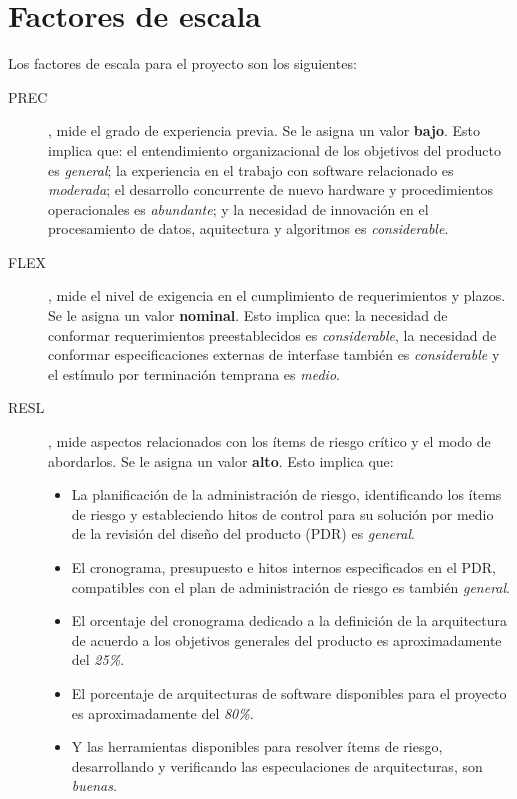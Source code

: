 \documentclass[11pt,a4paper,spanish,twoside]{book}
\begin{document}
\section{Factores de escala}
Los factores de escala para el proyecto son los siguientes:
\begin{description}
\item[PREC], mide el grado de experiencia previa. Se le asigna un valor
\textbf{bajo}. Esto implica que: el entendimiento organizacional de los objetivos del producto es \emph{general}; la experiencia en el trabajo con
software relacionado es \emph{moderada}; el desarrollo concurrente de nuevo
hardware y procedimientos operacionales es \emph{abundante}; y la necesidad
de innovación en el procesamiento de datos, aquitectura y algoritmos es
\emph{considerable}.

\item[FLEX], mide el nivel de exigencia en el cumplimiento de requerimientos
y plazos. Se le asigna un valor \textbf{nominal}. Esto implica que: la
necesidad de conformar requerimientos preestablecidos es \emph{considerable},
la necesidad de conformar especificaciones externas de interfase también es
\emph{considerable} y el estímulo por terminación temprana es \emph{medio}.

\item[RESL], mide aspectos relacionados con los ítems de riesgo crítico y el
modo de abordarlos. Se le asigna un valor \textbf{alto}. Esto implica que:
\begin{itemize}
\item La planificación de la administración de riesgo, identificando los
ítems de riesgo y estableciendo hitos de control para su solución por medio
de la revisión del diseño del producto (PDR) es \emph{general}.
\item El cronograma, presupuesto e hitos internos especificados en el PDR,
compatibles con el plan de administración de riesgo es también \emph{general}.
\item El orcentaje del cronograma dedicado a la definición de la arquitectura
de acuerdo a los objetivos generales del producto es aproximadamente del
\emph{25\%}.
\item El porcentaje de arquitecturas de software disponibles para el proyecto
es aproximadamente del \emph{80\%}.
\item Y las herramientas disponibles para resolver ítems de riesgo,
desarrollando y verificando las especulaciones de arquitecturas, son
\emph{buenas}.
\end{itemize}


\end{description}
\end{document}
